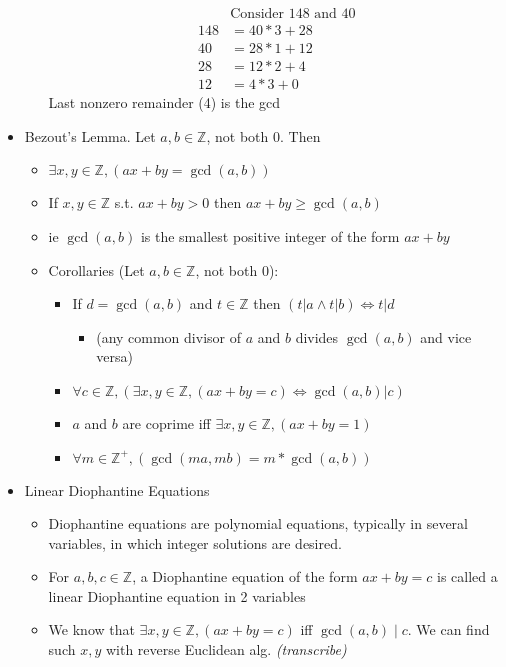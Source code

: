 \documentclass[11pt]{article}
\theoremstyle{definition}
\newcommand{\bb}[1]{\mathbb{#1}}
\begin{document}
\begin{itemize}
\begin{itemize}
\begin{align*}
            &\text{Consider 148 and 40} \\
            148 &= 40*3 + 28 \\
            40 &= 28*1 + 12 \\
            28 &= 12*2 + 4 \\
            12 &= 4*3 + 0
        \end{align*}
        Last nonzero remainder (4) is the gcd
    \end{itemize}
    \item Bezout's Lemma. Let $a,b\in\bb{Z}$, not both 0. Then
    \begin{itemize}
        \item $\exists x,y\in \bb{Z}, (ax+by=\gcd(a,b))$
        \item If $x,y\in\bb{Z}$ s.t. $ax+by>0$ then $ax+by\ge \gcd(a,b)$
        \item ie $\gcd(a,b)$ is the smallest positive integer of the form $ax+by$
        \item Corollaries (Let $a,b\in\bb{Z}$, not both 0):
        \begin{itemize}
            \item If $d=\gcd(a,b)$ and $t\in\bb{Z}$ then $(t|a \land t|b)\Leftrightarrow t|d$
            \begin{itemize}
                \item (any common divisor of $a$ and $b$ divides $\gcd(a,b)$ and vice versa)
            \end{itemize}
            \item $\forall c\in\bb{Z}, (\exists x,y\in\bb{Z}, (ax+by=c) \Leftrightarrow \gcd(a,b) | c)$
            \item $a$ and $b$ are coprime iff $\exists x,y\in\bb{Z}, (ax+by = 1)$
            \item $\forall m\in\bb{Z}^+,(\gcd(ma,mb)=m*\gcd(a,b))$
        \end{itemize}
    \end{itemize}
    \item Linear Diophantine Equations
    \begin{itemize}
        \item Diophantine equations are polynomial equations, typically in several variables, in which integer solutions are desired.
        \item For $a,b,c\in\bb{Z}$, a Diophantine equation of the form $ax+by=c$ is called a linear Diophantine equation in 2 variables
        \item We know that $\exists x,y\in\bb{Z}, (ax+by=c)$ iff $\gcd(a,b)\mid c$. We can find such $x,y$ with reverse Euclidean alg. \emph{(transcribe)}

\end{itemize}
\end{itemize}
\end{document}
